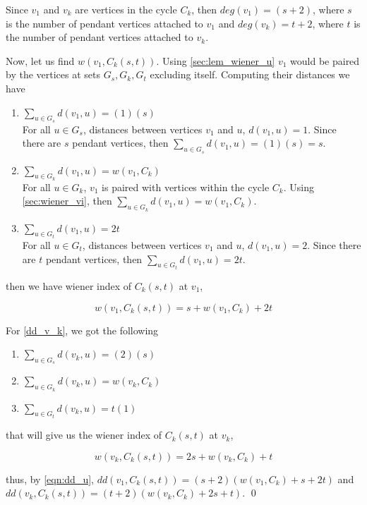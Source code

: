 \proof
Since $v_1$ and $v_k$ are vertices in the cycle $C_k$, then $deg(v_1)=(s+2)$, where $s$ is the number of pendant vertices attached to $v_1$ and $deg(v_k)=t+2$, where $t$ is the number of pendant vertices attached to $v_k$. 

Now, let us find $w(v_1,C_k(s,t))$. Using \href{chap2.tex}{\ref{sec:lem_wiener_u}} $v_1$ would be paired by the vertices at sets $G_s,G_k,G_t$ excluding itself. Computing their distances we have \medskip

\begin{enumerate}
\item $\sum_{u\in G_s}d(v_1,u)=(1)(s)$ \\
For all $u\in G_s$, distances between vertices $v_1$ and $u$, $d(v_1,u)=1$. Since there are $s$ pendant vertices, then $\sum_{u\in G_s}d(v_1,u)=(1)(s)=s$.
\item $\sum_{u\in G_k}d(v_1,u)=w(v_1,C_k)$ \\
For all $u\in G_k$, $v_1$ is paired with vertices within the cycle $C_k$. Using \href{chap2.tex}{\ref{sec:wiener_vi}}, then $\sum_{u\in G_k}d(v_1,u)=w(v_1,C_k)$. 
\item $\sum_{u\in G_t}d(v_1,u)=2t$\\
For all $u\in G_t$, distances between vertices $v_1$ and $u$, $d(v_1,u)=2$. Since there are $t$ pendant vertices, then $\sum_{u\in G_t}d(v_1,u)=2t$.
\end{enumerate}  

then we have wiener index of $C_k(s,t)$ at $v_1$,

\begin{equation}
w(v_1,C_k(s,t))=s+w(v_1,C_k)+2t
\label{wiener_v1}
\end{equation}

For \ref{dd_v_k}, we got the following 

\begin{enumerate}
\item $\sum_{u\in G_s}d(v_k,u)=(2)(s)$
\item $\sum_{u\in G_k}d(v_k,u)=w(v_k,C_k)$
\item $\sum_{u\in G_t}d(v_k,u)=t(1)$
\end{enumerate}  

that will give us the wiener index of $C_k(s,t)$ at $v_k$,

\begin{equation}
w(v_k,C_k(s,t))=2s+w(v_k,C_k)+t
\label{weiner_vk}
\end{equation}
 
thus, by \ref{eqn:dd_u}, $dd(v_1,C_k(s,t))=(s+2)(w(v_1,C_k)+s+2t)$ and $dd(v_k,C_k(s,t))=(t+2)(w(v_k,C_k)+2s+t)$. \qed

